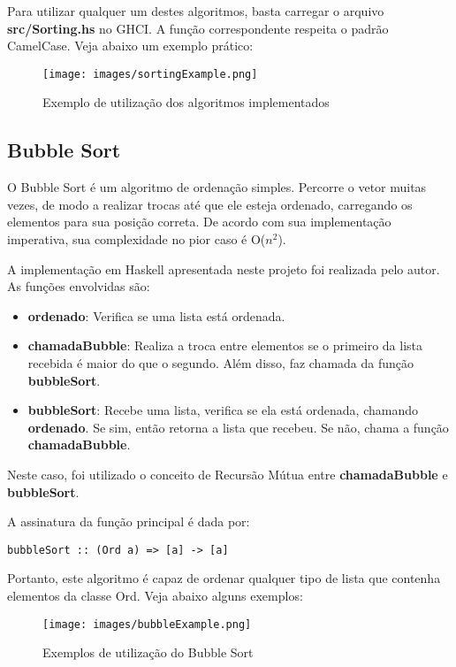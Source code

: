 \documentclass[12pt,a4paper]{article}
\begin{document}
Para utilizar qualquer um destes algoritmos, basta carregar o arquivo \textbf{src/Sorting.hs} no GHCI. A função correspondente respeita o padrão CamelCase. Veja abaixo um exemplo prático:

\begin{figure}[h]
	\centering
	\texttt{[image: images/sortingExample.png]}
	\caption{Exemplo de utilização dos algoritmos implementados}
\end{figure}

\subsection{Bubble Sort}
O Bubble Sort é um algoritmo de ordenação simples. Percorre o vetor muitas vezes, de modo a realizar trocas até que ele esteja ordenado, carregando os elementos para sua posição correta. De acordo com sua implementação imperativa, sua complexidade no pior caso é O($n^2$). 

A implementação em Haskell apresentada neste projeto foi realizada pelo autor. As funções envolvidas são:
\begin{itemize}
\item \textbf{ordenado}: Verifica se uma lista está ordenada.
\item \textbf{chamadaBubble}: Realiza a troca entre elementos se o primeiro da lista recebida é maior do que o segundo. Além disso, faz chamada da função \textbf{bubbleSort}.
\item \textbf{bubbleSort}: Recebe uma lista, verifica se ela está ordenada, chamando \textbf{ordenado}. Se sim, então retorna a lista que recebeu. Se não, chama a função \textbf{chamadaBubble}. 
\end{itemize}
Neste caso, foi utilizado o conceito de Recursão Mútua entre \textbf{chamadaBubble} e \textbf{bubbleSort}. 

A assinatura da função principal é dada por:

\begin{lstlisting}
bubbleSort :: (Ord a) => [a] -> [a]
\end{lstlisting}

Portanto, este algoritmo é capaz de ordenar qualquer tipo de lista que contenha elementos da classe Ord. Veja abaixo alguns exemplos:

\begin{figure}[h]
	\centering
	\texttt{[image: images/bubbleExample.png]}
	\caption{Exemplos de utilização do Bubble Sort}
\end{figure}
\end{document}
